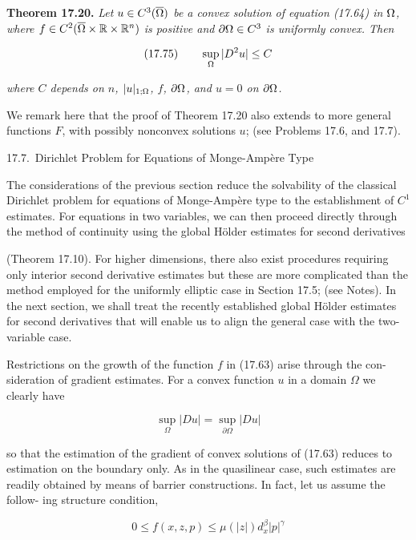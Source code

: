 \textbf{Theorem 17.20.} \textit{Let $u\in C^3(\overline{\Omega})$ be a convex solution of equation (17.64) in $\Omega$, where
$f\in C^2(\overline{\Omega}\times \mathbb{R} \times \mathbb{R}^n)$ is positive and $\partial\Omega\in C^3$ is uniformly convex. Then}

\[
(17.75)\qquad \sup_{\Omega} |D^2u| \le C
\]

\textit{where $C$ depends on $n$, $|u|_{1;\Omega}$, $f$, $\partial\Omega$, and $u=0$ on $\partial\Omega$.}

We remark here that the proof of Theorem 17.20 also extends to more general
functions $F$, with possibly nonconvex solutions $u$; (see Problems 17.6, and 17.7).

17.7.\ Dirichlet Problem for Equations of
Monge-Amp\`ere Type

The considerations of the previous section reduce the solvability of the classical
Dirichlet problem for equations of Monge-Amp\`ere type to the establishment of $C^1$
estimates. For equations in two variables, we can then proceed directly through the
method of continuity using the global H\"older estimates for second derivatives




(Theorem 17.10). For higher dimensions, there also exist procedures requiring only
interior second derivative estimates but these are more complicated than the method
employed for the uniformly elliptic case in Section 17.5; (see Notes). In the next
section, we shall treat the recently established global Hölder estimates for second
derivatives that will enable us to align the general case with the two-variable case.

Restrictions on the growth of the function $f$ in (17.63) arise through the con-
sideration of gradient estimates. For a convex function $u$ in a domain $\Omega$ we clearly
have

\begin{equation}
\tag{17.76}
\sup_{\Omega} |Du| = \sup_{\partial\Omega} |Du|
\end{equation}

so that the estimation of the gradient of convex solutions of (17.63) reduces to
estimation on the boundary only. As in the quasilinear case, such estimates are
readily obtained by means of barrier constructions. In fact, let us assume the follow-
ing structure condition,

\begin{equation}
\tag{17.77}
0 \le f(x,z,p) \le \mu(|z|) d_x^{\beta} |p|^{\gamma}
\end{equation}

